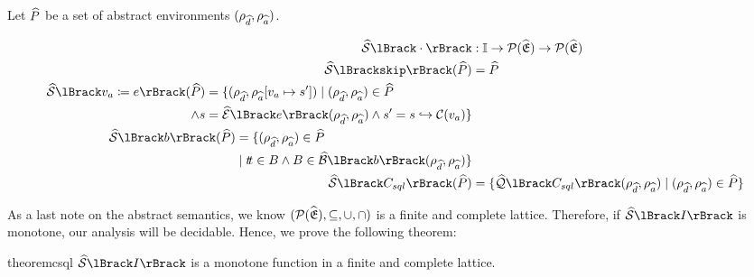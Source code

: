 Let $\widehat{P}$ be a set of abstract environments $(\rho_{\widehat{d}}, \rho_{\widehat{a}})$.

\begin{align} \label{eq:abssemtype}
    \abssem{\cdot} &: \mathbb{I} \rightarrow \mathcal{P}(\ab{\mathfrak{E}}) \rightarrow \mathcal{P}(\ab{\mathfrak{E}}) \\
    \abssem{\texttt{skip}}(\ab{P}) &= \ab{P} \\
    \begin{split}
        \abssem{v_a \coloneqq e}(\ab{P}) &= \{(\env{\ab{d}}, \env{\absvars}[v_a \mapsto s']) \mid (\env{\ab{d}}, \env{\absvars}) \in \ab{P} \\
        \land s &= \absexpsem{e}(\env{\ab{d}}, \env{\absvars}) \land s' = s \into \lookupcl(v_a) \}
    \end{split}\\
    \begin{split}
        \abssem{b}(\ab{P}) &= \{ (\env{\ab{d}}, \env{\absvars}) \in \ab{P} \\
        & \mid \true \in B \land B \in \absboolsem{b}(\env{\ab{d}}, \env{\absvars}) \}
    \end{split} \\
    \abssem{C_{sql}}(\ab{P}) &= \{\abssqlsem{C_{sql}}(\env{\ab{d}}, \env{\absvars}) \mid (\env{\ab{d}}, \env{\absvars}) \in \ab{P} \}
\end{align}

As a last note on the abstract semantics, we know $(\mathcal{P}(\widehat{\mathfrak{E}}), \subseteq, \cup, \cap)$ is a finite and complete lattice.
Therefore, if $\abssem{I}$ is monotone, our analysis will be decidable.
Hence, we prove the following theorem:

\begin{restatable}{theorem}{csql}\label{thm:csql}
    $\abssem{I}$ is a monotone function in a finite and complete lattice.
\end{restatable}

